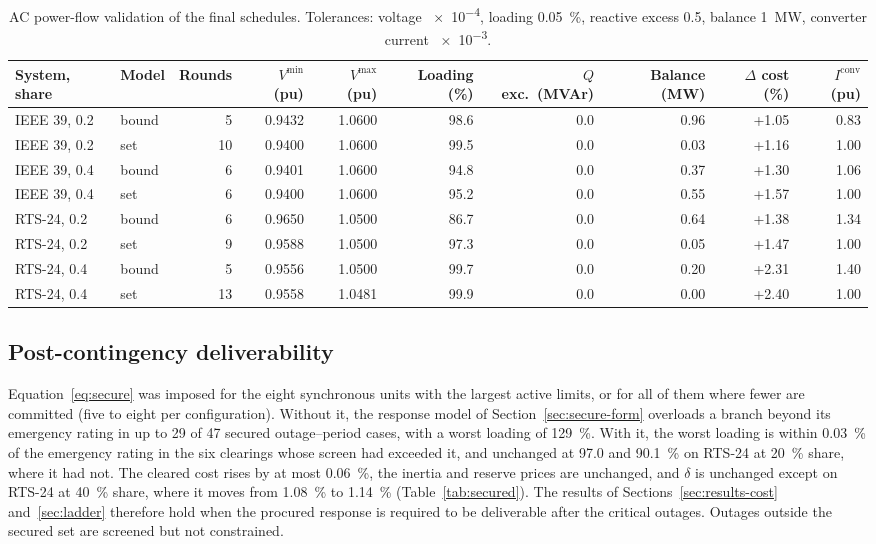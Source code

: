 \begin{table}[t]
  \caption{AC power-flow validation of the final schedules. Tolerances:
  voltage \SI{e-4}{\pu}, loading \SI{0.05}{\percent}, reactive excess
  \SI{0.5}{\MVAr}, balance \SI{1}{\MW}, converter current \SI{e-3}{\pu}.}
  \label{tab:acfinal}
  \centering
  \small
  \begin{tabular*}{\textwidth}{@{\extracolsep{\fill}}ll r rr r r r r r@{}}
    \toprule
    System, share & Model & Rounds & $V^{\min}$ (pu) & $V^{\max}$ (pu)
      & Loading (\%) & $Q$ exc.\ (MVAr) & Balance (MW)
      & $\Delta$ cost (\%) & $I^{\mathrm{conv}}$ (pu) \\
    \midrule
    IEEE 39, 0.2 & bound & 5 & 0.9432 & 1.0600 & 98.6 & 0.0 & 0.96 & +1.05 & 0.83 \\
    IEEE 39, 0.2 & set & 10 & 0.9400 & 1.0600 & 99.5 & 0.0 & 0.03 & +1.16 & 1.00 \\
    IEEE 39, 0.4 & bound & 6 & 0.9401 & 1.0600 & 94.8 & 0.0 & 0.37 & +1.30 & 1.06 \\
    IEEE 39, 0.4 & set & 6 & 0.9400 & 1.0600 & 95.2 & 0.0 & 0.55 & +1.57 & 1.00 \\
    RTS-24, 0.2 & bound & 6 & 0.9650 & 1.0500 & 86.7 & 0.0 & 0.64 & +1.38 & 1.34 \\
    RTS-24, 0.2 & set & 9 & 0.9588 & 1.0500 & 97.3 & 0.0 & 0.05 & +1.47 & 1.00 \\
    RTS-24, 0.4 & bound & 5 & 0.9556 & 1.0500 & 99.7 & 0.0 & 0.20 & +2.31 & 1.40 \\
    RTS-24, 0.4 & set & 13 & 0.9558 & 1.0481 & 99.9 & 0.0 & 0.00 & +2.40 & 1.00 \\
    \bottomrule
  \end{tabular*}
\end{table}

\subsection{Post-contingency deliverability}
\label{sec:postcontingency}

Equation~\eqref{eq:secure} was imposed for the eight synchronous units with
the largest active limits, or for all of them where fewer are committed (five
to eight per configuration). Without it, the
response model of Section~\ref{sec:secure-form} overloads a branch beyond its
emergency rating in up to \num{29} of \num{47} secured outage--period cases,
with a worst loading of \SI{129}{\percent}. With it, the worst loading is
within \SI{0.03}{\percent} of the emergency rating in the six clearings
whose screen had exceeded it, and unchanged at \SI{97.0}{} and
\SI{90.1}{\percent} on RTS-24 at \SI{20}{\percent} share, where it had
not. The cleared cost
rises by at most \SI{0.06}{\percent}, the inertia and reserve prices are
unchanged, and $\delta$ is unchanged except on RTS-24 at \SI{40}{\percent}
share, where it moves from \SI{1.08}{\percent} to \SI{1.14}{\percent}
(Table~\ref{tab:secured}). The results of Sections~\ref{sec:results-cost}
and~\ref{sec:ladder} therefore hold when the procured response is required
to be deliverable after the critical outages. Outages outside the secured set
are screened but not constrained.


